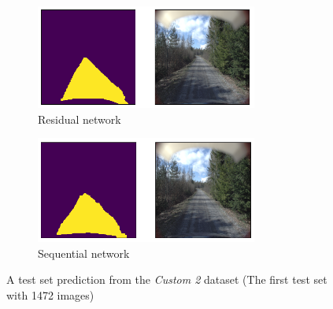 \documentclass[USenglish]{ifimaster}  %
\begin{document}
\begin{figure}[H]
\centering
\begin{subfigure}[b]{\textwidth}
\centering
\includegraphics[width=0.8\textwidth]{bilder/custom_2/474_res.png}
\caption{Residual network}
\label{fig:custom_2_res}
\end{subfigure}
\hfill
\begin{subfigure}[b]{\textwidth}
\centering
\includegraphics[width=0.8\textwidth]{bilder/custom_2/474_seq.png}
\caption{Sequential network}
\label{fig:custom_2_seq}
\end{subfigure}
\caption{A test set prediction from the \textit{Custom 2} dataset (The first test set with 1472 images)}
\end{figure}
\end{document}
